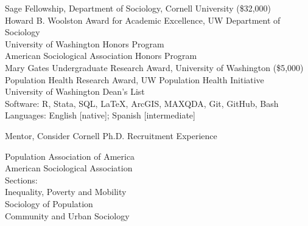 \documentclass[10pt]{article} %
\begin{document}
 Sage Fellowship, Department of Sociology, Cornell University (\$32,000) \\
 Howard B. Woolston Award for Academic Excellence, UW Department of Sociology \\
 University of Washington Honors Program \\
 American Sociological Association Honors Program \\
 Mary Gates Undergraduate Research Award, University of Washington (\$5,000)	\\	
 Population Health Research Award, UW Population Health Initiative 	\\
 University of Washington Dean’s List \\					     

Software: R, Stata, SQL, \LaTeX, ArcGIS, MAXQDA, Git, GitHub, Bash \\
Languages: English [native]; Spanish [intermediate] \\


\hspace*{10mm} Mentor, Consider Cornell Ph.D. Recruitment Experience \\
\smallskip 

Population Association of America \\
American Sociological Association \\
Sections: \\
\hspace*{10mm} Inequality, Poverty and Mobility \\
\hspace*{10mm} Sociology of Population \\
\hspace*{10mm} Community and Urban Sociology \\
\end{document}
